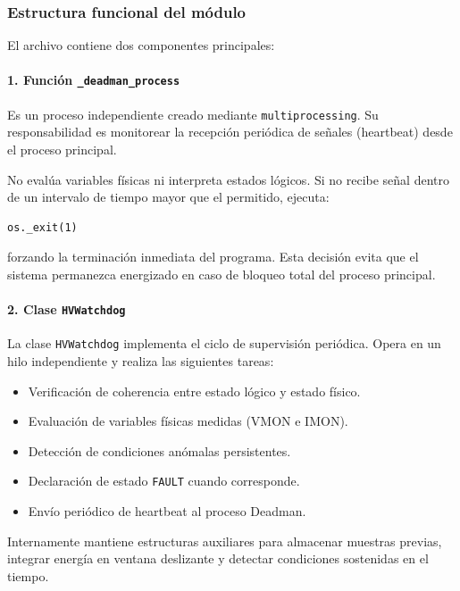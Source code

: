 \documentclass{article}
\begin{document}
\subsubsection{Estructura funcional del módulo}

El archivo contiene dos componentes principales:

\paragraph{1. Función \texttt{\_deadman\_process}}

Es un proceso independiente creado mediante \texttt{multiprocessing}. Su
responsabilidad es monitorear la recepción periódica de señales (heartbeat)
desde el proceso principal.

No evalúa variables físicas ni interpreta estados lógicos. Si no recibe señal
dentro de un intervalo de tiempo mayor que el permitido, ejecuta:

\begin{verbatim}
os._exit(1)
\end{verbatim}

forzando la terminación inmediata del programa. Esta decisión evita que el
sistema permanezca energizado en caso de bloqueo total del proceso principal.

\paragraph{2. Clase \texttt{HVWatchdog}}

La clase \texttt{HVWatchdog} implementa el ciclo de supervisión periódica.
Opera en un hilo independiente y realiza las siguientes tareas:

\begin{itemize}
\item Verificación de coherencia entre estado lógico y estado físico.
\item Evaluación de variables físicas medidas (VMON e IMON).
\item Detección de condiciones anómalas persistentes.
\item Declaración de estado \texttt{FAULT} cuando corresponde.
\item Envío periódico de heartbeat al proceso Deadman.
\end{itemize}

Internamente mantiene estructuras auxiliares para almacenar muestras previas,
integrar energía en ventana deslizante y detectar condiciones sostenidas
en el tiempo.
\end{document}
